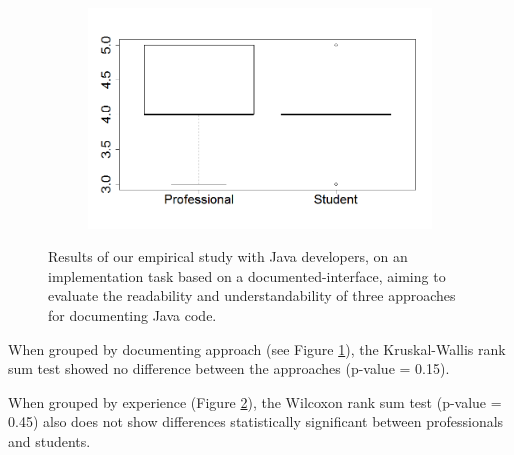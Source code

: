 \begin{figure}
\begin{subfigure}{.3\textwidth}
\caption{}
\label{fig:approachesEmpirical}
\end{subfigure}
\begin{subfigure}{.3\textwidth}
\includegraphics[width=1\linewidth]{figs/boxplotExperienceEmpiricalStudy}
\caption{}
\label{fig:experienceEmpirical}
\end{subfigure}
\caption{Results of our empirical study with Java developers, on an implementation task based on a
documented-interface, aiming to evaluate the readability and understandability of three approaches
for documenting Java code.}
\label{fig:empiricalResults}
\end{figure}



When grouped by documenting approach (see Figure \ref{fig:approachesEmpirical}),
the Kruskal-Wallis rank sum test showed no difference between the approaches
(p-value = 0.15).


When grouped by experience (Figure \ref{fig:experienceEmpirical}), the Wilcoxon
rank sum test (p-value = 0.45) also does not show differences statistically
significant between professionals and students. 

